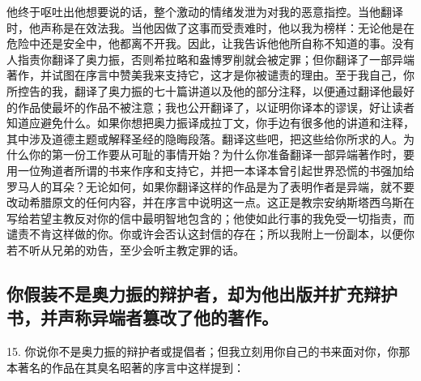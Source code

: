 他终于呕吐出他想要说的话，整个激动的情绪发泄为对我的恶意指控。当他翻译时，他声称是在效法我。当他因做了这事而受责难时，他以我为榜样：无论他是在危险中还是安全中，他都离不开我。因此，让我告诉他他所自称不知道的事。没有人指责你翻译了奥力振，否则希拉略和盎博罗削就会被定罪；但你翻译了一部异端著作，并试图在序言中赞美我来支持它，这才是你被谴责的理由。至于我自己，你所控告的我，翻译了奥力振的七十篇讲道以及他的部分注释，以便通过翻译他最好的作品使最坏的作品不被注意；我也公开翻译了，以证明你译本的谬误，好让读者知道应避免什么。如果你想把奥力振译成拉丁文，你手边有很多他的讲道和注释，其中涉及道德主题或解释圣经的隐晦段落。翻译这些吧，把这些给你所求的人。为什么你的第一份工作要从可耻的事情开始？为什么你准备翻译一部异端著作时，要用一位殉道者所谓的书来作序和支持它，并把一本译本曾引起世界恐慌的书强加给罗马人的耳朵？无论如何，如果你翻译这样的作品是为了表明作者是异端，就不要改动希腊原文的任何内容，并在序言中说明这一点。这正是教宗安纳斯塔西乌斯在写给若望主教反对你的信中最明智地包含的；他使如此行事的我免受一切指责，而谴责不肯这样做的你。你或许会否认这封信的存在；所以我附上一份副本，以便你若不听从兄弟的劝告，至少会听主教定罪的话。\par


\subsection{你假装不是奥力振的辩护者，却为他出版并扩充辩护书，并声称异端者篡改了他的著作。}

15. 你说你不是奥力振的辩护者或提倡者；但我立刻用你自己的书来面对你，你那本著名的作品在其臭名昭著的序言中这样提到：\par

\par


